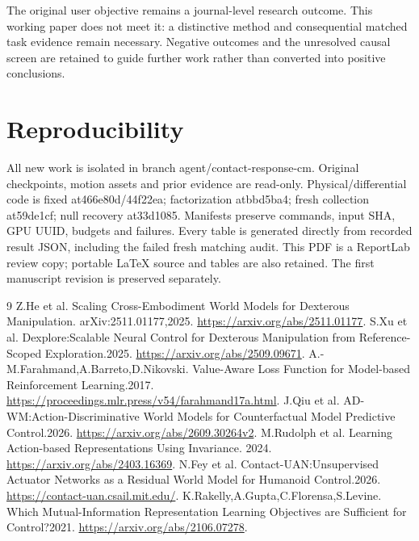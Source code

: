 \documentclass[10pt]{article}
\begin{document}
The original user objective remains a journal-level research outcome. This working
paper does not meet it: a distinctive method and consequential matched task evidence
remain necessary. Negative outcomes and the unresolved causal screen are retained
to guide further work rather than converted into positive conclusions.

\section*{Reproducibility}
All new work is isolated in branch agent/contact-response-cm. Original checkpoints,
motion assets and prior evidence are read-only. Physical/differential code is fixed
at466e80d/44f22ea; factorization atbbd5ba4; fresh collection at59de1cf; null recovery
at33d1085. Manifests preserve commands, input SHA, GPU UUID, budgets and failures.
Every table is generated directly from recorded result JSON, including the failed
fresh matching audit. This PDF is a ReportLab review copy; portable LaTeX source
and tables are also retained. The first manuscript revision is preserved separately.

\begin{thebibliography}{9}
 Z.He et al. Scaling Cross-Embodiment World Models for Dexterous Manipulation.
arXiv:2511.01177,2025. \url{https://arxiv.org/abs/2511.01177}.
 S.Xu et al. Dexplore:Scalable Neural Control for Dexterous Manipulation
from Reference-Scoped Exploration.2025. \url{https://arxiv.org/abs/2509.09671}.
 A.-M.Farahmand,A.Barreto,D.Nikovski. Value-Aware Loss Function
for Model-based Reinforcement Learning.2017. \url{https://proceedings.mlr.press/v54/farahmand17a.html}.
 J.Qiu et al. AD-WM:Action-Discriminative World Models for Counterfactual
Model Predictive Control.2026. \url{https://arxiv.org/abs/2609.30264v2}.
 M.Rudolph et al. Learning Action-based Representations Using Invariance.
2024. \url{https://arxiv.org/abs/2403.16369}.
 N.Fey et al. Contact-UAN:Unsupervised Actuator Networks as a Residual
World Model for Humanoid Control.2026. \url{https://contact-uan.csail.mit.edu/}.
 K.Rakelly,A.Gupta,C.Florensa,S.Levine. Which Mutual-Information
Representation Learning Objectives are Sufficient for Control?2021.
\url{https://arxiv.org/abs/2106.07278}.
\end{thebibliography}
\end{document}
